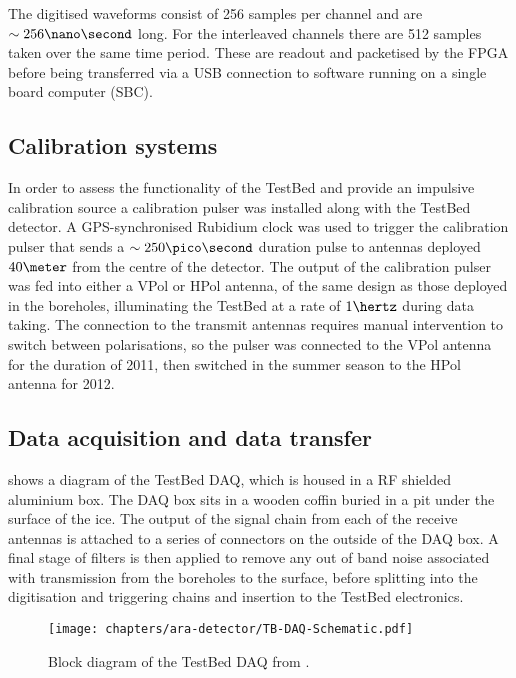 The digitised waveforms consist of 256 samples per channel and are $\sim 256 \nano \second$ long. For the interleaved channels there are 512 samples taken over the same time period. These are readout and packetised by the FPGA before being transferred via a USB connection to software running on a single board computer (SBC).

\subsection{Calibration systems}
\label{sec:ara-detector:TestBed:Calibration-systems}

In order to assess the functionality of the TestBed and provide an impulsive calibration source a calibration pulser was installed along with the TestBed detector. A GPS-synchronised Rubidium clock was used to trigger the calibration pulser that sends a $\sim 250 \pico \second$ duration pulse to antennas deployed $40 \meter$ from the centre of the detector. The output of the calibration pulser was fed into either a VPol or HPol antenna, of the same design as those deployed in the boreholes, illuminating the TestBed at a rate of $1 \hertz$ during data taking. The connection to the transmit antennas requires manual intervention to switch between polarisations, so the pulser was connected to the VPol antenna for the duration of 2011, then switched in the summer season to the HPol antenna for 2012.


\subsection{Data acquisition and data transfer}
\label{sec:ara-detector:TestBed:Data-Acquisition}

 shows a diagram of the TestBed DAQ, which is housed in a RF shielded aluminium box. The DAQ box sits in a wooden coffin buried in a pit under the surface of the ice. The output of the signal chain from each of the receive antennas is attached to a series of connectors on the outside of the DAQ box. A final stage of filters is then applied to remove any out of band noise associated with transmission from the boreholes to the surface, before splitting into the digitisation and triggering chains and insertion to the TestBed electronics.

\begin{figure}[htpb]
  \centering
  \texttt{[image: chapters/ara-detector/TB-DAQ-Schematic.pdf]}
  \caption{Block diagram of the TestBed DAQ from \cite{Allison2012457}.}
  \label{fig:ara-detector:TestBed:DAQ-Schematic}
\end{figure}


